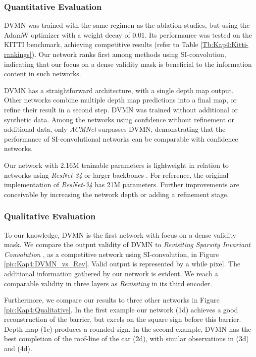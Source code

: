 \documentclass[letterpaper, 10 pt, conference]{ieeeconf}  \usepackage{geometry}
\begin{document}
\subsubsection{Quantitative Evaluation}
DVMN was trained with the same regimen as the ablation studies, but using the AdamW optimizer with a weight decay of 0.01. Its performance was tested on the KITTI benchmark, achieving competitive results (refer to Table \ref{Tb:Kap4:Kitti-rankings}). Our network ranks first among methods using SI-convolution, indicating that our focus on a dense validity mask is beneficial to the information content in such networks.

DVMN has a straightforward architecture, with a single depth map output. Other networks combine multiple depth map predictions into a final map, or refine their result in a second step. DVMN was trained without additional or synthetic data. Among the networks using confidence without refinement or additional data, only \textit{ACMNet} surpasses DVMN, demonstrating that the performance of SI-convolutional networks can be comparable with confidence networks. 

Our network with 2.16M trainable parameters is lightweight in relation to networks using \textit{ResNet-34} \cite{ResBottleneck} or larger backbones \cite{FCFR_Net, CSPN++, PWP, CSPN}. For reference, the original implementation of \textit{ResNet-34} has 21M parameters. Further improvements are conceivable by increasing the network depth or adding a refinement stage.

\subsubsection{Qualitative Evaluation}
To our knowledge, DVMN is the first network with focus on a dense validity mask. We compare the output validity of DVMN to \textit{Revisiting Sparsity Invariant Convolution} \cite{Revisiting_Sparsity}, as a competitive network using SI-convolution, in Figure \ref{pic:Kap4:DVMN_vs_Rev}. Valid output is represented by a while pixel. The additional information gathered by our network is evident. We reach a comparable validity in three layers as \textit{Revisiting} in its third encoder.

Furthermore, we compare our results to three other networks in Figure \ref{pic:Kap4:Qualitative}. In the first example our network (1d) achieves a good reconstruction of the barrier, but excels on the square sign before this barrier. Depth map (1c) produces a rounded sign. In the second example, DVMN has the best completion of the roof-line of the car (2d), with similar observations in (3d) and (4d).
\end{document}
